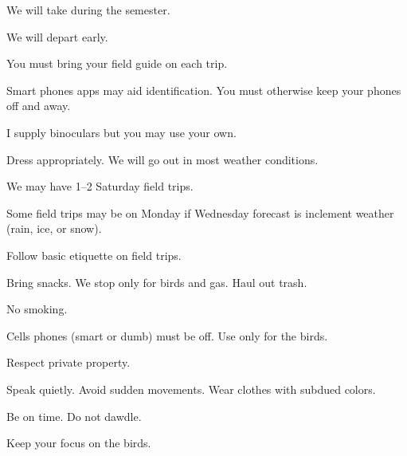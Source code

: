 \documentclass[t,handout]{beamer}  %
\begin{document}
\begin{frame}[t,plain]{We will take  during the semester.}

	\vspace{-0.5\baselineskip}
	
	\hangpara We will depart early. 
	
	
	\hangpara You must bring your field guide on each trip.

	\hangpara Smart phones apps may aid identification. You must otherwise keep your phones off and away.

	\hangpara I supply binoculars but you may use your own. 

	\hangpara Dress appropriately. We will go out in most weather conditions.
		
	\hangpara We may have 1–2 Saturday field trips.
	
	\hangpara Some field trips may be on Monday if Wednesday forecast is inclement weather (rain, ice, or snow).
	
\end{frame}

\begin{frame}[t,plain]{Follow basic etiquette on field trips.}

	\vspace{-0.5\baselineskip}
	
	\hangpara Bring snacks. We stop only for birds and gas. Haul out  trash.
	
	\hangpara No smoking.
	

	\hangpara Cells phones (smart or dumb) must be off. Use only for the birds.

	\hangpara Respect private property.
	
	\hangpara Speak quietly. Avoid sudden movements. Wear clothes with subdued colors.
	
	\hangpara Be on time. Do not dawdle.
	
	\hangpara Keep your focus on the birds.
	
\end{frame}
\end{document}
